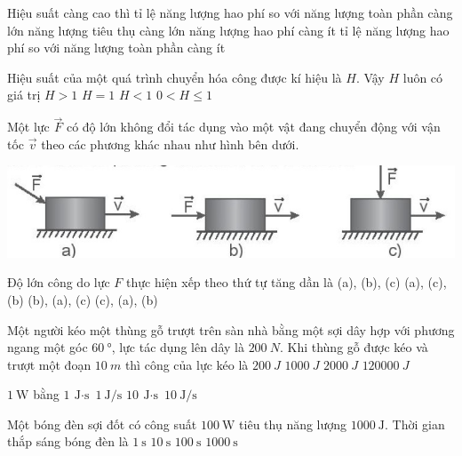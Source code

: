 \begin{ex}
	Hiệu suất càng cao thì	
	\choice
	{tỉ lệ năng lượng hao phí so với năng lượng toàn phần càng lớn}
	{năng lượng tiêu thụ càng lớn}
	{năng lượng hao phí càng ít}
	{\True tỉ lệ năng lượng hao phí so với năng lượng toàn phần càng ít}
	\loigiai{}
\end{ex}
\begin{ex}
	Hiệu suất của một quá trình chuyển hóa công được kí hiệu là $H$. Vậy $H$ luôn có giá trị	
	\choice
	{$H>1$}
	{$H=1$}
	{$H<1$}
	{\True $0<H\le 1$}
	\loigiai{}
\end{ex}
\begin{ex}
	Một lực $\vec{F}$ có độ lớn không đổi tác dụng vào một vật đang chuyển động với vận tốc $\vec{v}$ theo các phương khác nhau như hình bên dưới.
	\begin{center}
		\includegraphics[width=0.4\linewidth]{../figs/VN10-2023-PH-TP024-P-5}
	\end{center}
	Độ lớn công do lực $F$ thực hiện xếp theo thứ tự tăng dần là
	\choice
	{(a), (b), (c)}
	{(a), (c), (b)}
	{(b), (a), (c)}
	{\True (c), (a), (b)}
	\loigiai{}
\end{ex}
\begin{ex}
	Một người kéo một thùng gỗ trượt trên sàn nhà bằng một sợi dây hợp với phương ngang một góc $\SI{60}{\degree}$, lực tác dụng lên dây là $\SI{200}{N}$. Khi thùng gỗ được kéo và trượt một đoạn $\SI{10}{m}$ thì công của lực kéo là	
	\choice
	{$\SI{200}{J}$}
	{\True $\SI{1000}{J}$}
	{$\SI{2000}{J}$}
	{$\SI{120000}{J}$}
\end{ex}	
\begin{ex}
	$\SI{1}{\watt}$ bằng
	\choice
	{$\SI{1}{\joule\cdot\second}$}
	{\True $\SI{1}{\joule/\second}$}
	{$\SI{10}{\joule\cdot\second}$}
	{$\SI{10}{\joule/\second}$}
	\loigiai{}
\end{ex}
\begin{ex}
	Một bóng đèn sợi đốt có công suất $\SI{100}{\watt}$ tiêu thụ năng lượng $\SI{1000}{\joule}$. Thời gian thắp sáng bóng đèn là
	\choice
	{$\SI{1}{\second}$}
	{\True $\SI{10}{\second}$}
	{$\SI{100}{\second}$}
	{$\SI{1000}{\second}$}
	\loigiai{}
\end{ex}
